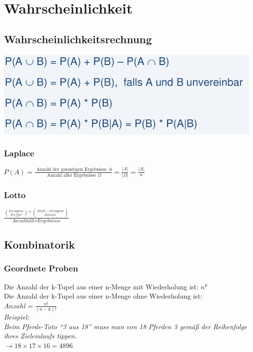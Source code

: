 
\section{Wahrscheinlichkeit}



\subsection{Wahrscheinlichkeitsrechnung}

\includegraphics[width=\linewidth]{graphic/extern-reto/Wahrscheinlichkeit.png}

\subsubsection{Laplace}
\colorbox{lightlightgrey}{$P(A)=\frac{\text { Anzahl der guenstigen Ergebnisse } A}{\text { Anzahl aller Ergebnisse } \Omega}=\frac{|A|}{|\Omega|}=\frac{|A|}{n}$}

\subsubsection{Lotto}
\colorbox{lightlightgrey}{$\frac{\binom{Gezogene}{Treffer} * \binom{Nicht-Gezogene}{Falsche}}{Anzahl aller Ergebnisse}$}\\


\subsection{Kombinatorik}

\subsubsection{Geordnete Proben}
Die Anzahl der  k-Tupel aus einer n-Menge \textcolor{subsectioncolor}{mit Wiederholung} ist: \colorbox{lightlightgrey}{$n^k$}\\
Die Anzahl der  k-Tupel aus einer n-Menge \textcolor{subsectioncolor}{ohne Wiederholung} ist:\\
\colorbox{lightlightgrey}{$Anzahl =\frac{n !}{(n-k) !}$}\\
\textit{Beispiel:}\\
\textit{Beim Pferde-Toto “3 aus 18” muss man von 18 Pferden 3 gemäß der Reihenfolge ihres Zieleinlaufs tippen.}\\
$\rightarrow 18 \times 17 \times 16 = 4896$


